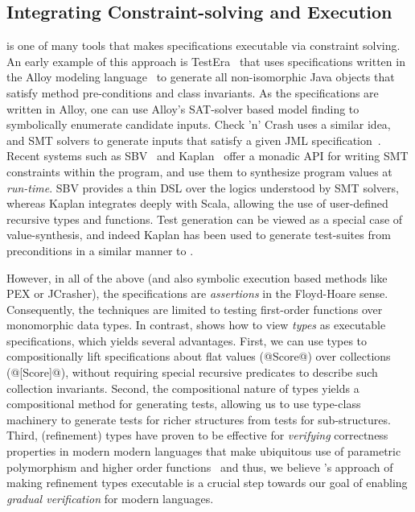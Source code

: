 \subsection{Integrating Constraint-solving and Execution}
\label{sec:constraint-solving-execution}

\toolname is one of many tools that makes specifications 
executable via constraint solving. 
%
An early example of this approach is 
TestEra~\cite{Marinov:2001:TNF:872023.872551} 
that uses specifications written in the Alloy 
modeling language~\cite{jackson2002alloy} to 
generate all non-isomorphic Java objects that 
satisfy method pre-conditions and class invariants. 
%
As the specifications are written in Alloy, one can use 
Alloy's SAT-solver based model finding to symbolically 
enumerate candidate inputs.
%
Check 'n' Crash uses a similar idea, and SMT 
solvers to generate inputs that satisfy a given 
JML specification~\cite{jcrasher}.
%
Recent systems such as SBV~\cite{sbv} and 
Kaplan~\cite{Koksal:2012:CC:2103656.2103675} 
offer a monadic API for writing SMT constraints 
within the program, and use them to synthesize 
program values at \emph{run-time}. 
%
SBV provides a thin DSL over the logics understood 
by SMT solvers, whereas Kaplan integrates deeply 
with Scala, allowing the use of user-defined 
recursive types and functions. 
%
Test generation can be viewed as a special case 
of value-synthesis, and indeed Kaplan has been 
used to generate test-suites from preconditions 
in a similar manner to \toolname.

However, in all of the above (and also symbolic execution 
based methods like PEX or JCrasher), the specifications are 
\emph{assertions} in the Floyd-Hoare sense. 
%
Consequently, the techniques are limited to testing 
first-order functions over monomorphic data types.
%
In contrast, \toolname shows how to view \emph{types} as
executable specifications, which yields several advantages.
%
First, we can use types to compositionally lift specifications 
about flat values (\eg @Score@) over collections (\eg @[Score]@),
without requiring special recursive predicates to describe 
such collection invariants. 
%
Second, the compositional nature of types yields a 
compositional method for generating tests, allowing 
us to use type-class machinery to generate tests for
richer structures from tests for sub-structures.
%
Third, (refinement) types have proven to be effective 
for \emph{verifying} correctness properties in modern
modern languages that make ubiquitous use of parametric 
polymorphism and higher order 
functions~\cite{pfenningxi98,Dunfield07,SaraswatX10,fstar,VazouRealWorld14} 
and thus, we believe \toolname's approach of making refinement types
executable is a crucial step towards %
our goal of enabling 
\emph{gradual verification} for modern languages.

